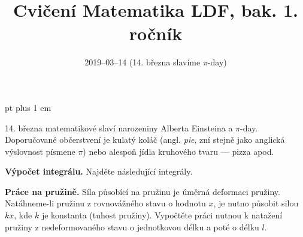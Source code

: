 \documentclass{article}
\let\oldtextbf\textbf
\def\textbf#1{%
  \oldtextbf{\color{red} #1}}
\begin{document}
 pt plus 1 em
\title{Cvičení Matematika LDF, bak. 1. ročník}
\date{2019--03--14 (14. března slavíme $\pi$-day)}
\maketitle

14. března matematikové slaví narozeniny Alberta Einsteina a
$\pi$-day. Doporučované občerstvení je kulatý koláč
(angl. \textit{pie}, zní stejně jako anglická výslovnost písmene
$\pi$) nebo alespoň jídla kruhového tvaru --- pizza apod.

\newpage


\def\tg{\mathop{\mathrm{tg}}}
\def\cotg{\mathop{\mathrm{cotg}}}
\def\arctg{\mathop{\mathrm{arctg}}}


\textbf{Výpočet integrálu.} Najděte následující integrály.


\newpage

\textbf{Práce na pružině.} Síla působící na pružinu je úměrná
deformaci pružiny. Natáhneme-li pružinu z rovnovážného stavu o hodnotu
$x$, je nutno působit silou $kx$, kde $k$ je konstanta (tuhost
pružiny). Vypočtěte práci nutnou k natažení pružiny z nedeformovaného
stavu o jednotkovou délku a poté o délku $l$.
\end{document}
